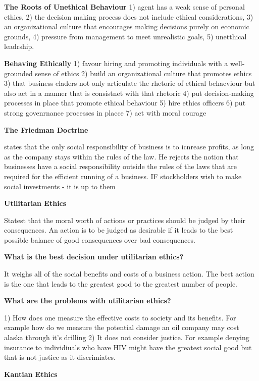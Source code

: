 \documentclass[12pt]{article}
\begin{document}
\begin{framed}
{{			\textbf{The Roots of Unethical Behaviour} 1) agent has a weak sense of personal ethics, 2) the decision making process does not include ethical considerations, 3) an organizational culture that encourages making decisions purely on economic grounds, 4) pressure from management to meet unrealistic goals, 5) unetthical leadrship.
						
			\textbf{Behaving Ethically}
			1) favour hiring and promoting individuals with a well-grounded sense of ethics
			2) build an organizational culture that promotes ethics
			3) that business eladers not only articulate the rhetoric of ethical behacviour but also act in a manner that is consistnet with that rhetoric
			4) put decision-making processes in place that promote ethical behaviour
			5) hire ethics officers
			6) put strong govenrnance processes in placce
			7) act with moral courage
			
			\textbf{The Friedman Doctrine}
			
			states that the only social responsibility of business is to icnrease profits, as long as the company stays within the rules of the law. He rejects the notion that businesses have a social responsibility outside the rules of the laws that are required for the efficient running of a business. IF stockholders wish to make social investments - it is up to them
			
			\textbf{Utilitarian Ethics}
			
			Statest that the moral worth of actions or practices should be judged by their consequences. An action is to be judged as desirable if it leads to the best possible balance of good consequences over bad consequences. 
			
			\textbf{What is the best decision under utilitarian ethics?}
			
			It weighs all of the social benefits and costs of a business action. The best action is the one that leads to the greatest good to the greatest number of people. 
			
			\textbf{What are the problems with utilitarian ethics?}
			
			1) How does one measure the effective costs to society and its benefits. For example how do we measure the potential damage an oil company may cost alaska through it's drilling
			2) It does not consider justice. For example denying insurance to individiuals who have HIV might have the greatest social good but that is not justice as it discrimiates. 
			
			\textbf{Kantian Ethics}
			
}}
\end{framed}
\end{document}
